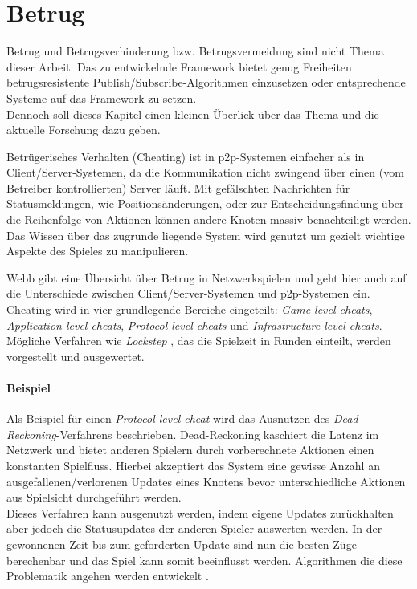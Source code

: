 \section{Betrug}
\label{chap:grundlagen:cheating}
Betrug und Betrugsverhinderung bzw. Betrugsvermeidung sind nicht Thema dieser Arbeit. Das zu entwickelnde Framework bietet genug Freiheiten betrugsresistente Publish/Subscribe-Algorithmen einzusetzen oder entsprechende Systeme auf das Framework zu setzen.\\
Dennoch soll dieses Kapitel einen kleinen Überlick über das Thema und die aktuelle Forschung dazu geben.

Betrügerisches Verhalten (Cheating) ist in p2p-Systemen einfacher als in Client/Server-Systemen, da die Kommunikation nicht zwingend über einen (vom Betreiber kontrollierten) Server läuft. Mit gefälschten Nachrichten für Statusmeldungen, wie Positionsänderungen, oder zur Entscheidungsfindung über die Reihenfolge von Aktionen können andere Knoten massiv benachteiligt werden. Das Wissen über das zugrunde liegende System wird genutzt um gezielt wichtige Aspekte des Spieles zu manipulieren.

Webb \cite{Webb2007Cheating} gibt eine Übersicht über Betrug in Netzwerkspielen und geht hier auch auf die Unterschiede zwischen Client/Server-Systemen und p2p-Systemen ein. Cheating wird in vier grundlegende Bereiche eingeteilt: \emph{Game level cheats}, \emph{Application level cheats}, \emph{Protocol level cheats} und \emph{Infrastructure level cheats}. Mögliche Verfahren wie \emph{Lockstep} \cite{Baughman2007}, das die Spielzeit in Runden einteilt, werden vorgestellt und ausgewertet.

\paragraph{Beispiel}
Als Beispiel für einen \emph{Protocol level cheat} wird das Ausnutzen des \emph{Dead-Reckoning}-Verfahrens \cite{Pantel2002} beschrieben. Dead-Reckoning kaschiert die Latenz im Netzwerk und bietet anderen Spielern durch vorberechnete Aktionen einen konstanten Spielfluss. Hierbei akzeptiert das System eine gewisse Anzahl an ausgefallenen/verlorenen Updates eines Knotens bevor unterschiedliche Aktionen aus Spielsicht durchgeführt werden.\\
Dieses Verfahren kann ausgenutzt werden, indem eigene Updates zurückhalten aber jedoch die Statusupdates der anderen Spieler auswerten werden. In der gewonnenen Zeit bis zum geforderten Update sind nun die besten Züge berechenbar und das Spiel kann somit beeinflusst werden. Algorithmen die diese Problematik angehen werden entwickelt \cite{Aggarwal2005}.

